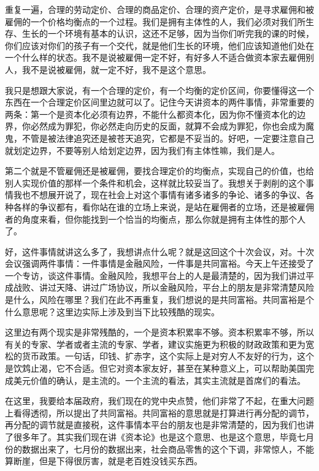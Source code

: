 \documentclass[UTF8, 12pt, a4paper]{ctexrep}
\begin{document}
重复一遍，合理的劳动定价、合理的商品定价、合理的资产定价，是寻求雇佣和被雇佣的一个价格均衡点的一个过程。我们是拥有主体性的人，我们必须对我们所生存、生长的一个环境有基本的认识，这还不足够，因为当你们听完我的课的时候，你们应该对你们的孩子有一个交代，就是他们生长的环境，他们应该知道他们处在一个什么样的状态。我不是说被雇佣一定不好，有好多人不适合做资本家去雇佣别人，我不是说被雇佣，就一定不好，我不是这个意思。

我只是想跟大家说，有一个合理的定价，有一个均衡的定价区间，你要懂得这一个东西在一个合理定价区间里边就可以了。记住今天讲资本的两件事情，非常重要的两条：第一个是资本化必须有边界，不能什么都资本化，因为你不懂资本化的边界，你必然成为罪犯，你必然走向历史的反面，就算不会成为罪犯，你也会成为魔鬼，不管是被法律追究还是被苍天追究，它都是不妥当的。好吧，一定要注意自己就划定边界，不要等别人给划定边界，因为我们有主体性嘛，我们是人。

第二个就是不管雇佣还是被雇佣，要找合理定价的均衡点，实现自己的价值，也给别人实现价值的那样一个条件和机会，这样就比较妥当了。我想关于剥削的这个事情我也不想展开说了，现在社会上对这个事情有诸多诸多的争论、诸多的争议、各种各样的争议都有，看你站在谁的立场上来说，是站在雇佣者的立场，还是被雇佣者的角度来看，但你能找到一个恰当的均衡点，那么你就是拥有主体性的那个人了。

好，这件事情就讲这么多了，我想讲点什么呢？就是这回这个十次会议，对。十次会议强调两件事情：一件事情是金融风险，一件事是共同富裕。今天上午还接受了一个专访，谈这件事情。金融风险，我想平台上的人是最清楚的，因为我们讲过平成战败、讲过天降、讲过广场协议，所以金融风险，平台上的朋友是非常清楚风险是什么，风险在哪里？我们在此不再重复，我们想说的是共同富裕。共同富裕是个什么意思呢？这里边实际上涉及到当下比较残酷的现实。

这里边有两个现实是非常残酷的，一个是资本积累率不够。资本积累率不够，所以有关的专家、学者或者主流的专家、学者，建议实施更为积极的财政政策和更为宽松的货币政策。一句话，印钱、扩赤字，这个实际上是对穷人不友好的行为，这个是饮鸩止渴，它不合适。但它对资本家友好，甚至在某种意义上，可以帮助美国完成美元价值的确认，是主流的。一个主流的看法，其实主流就是首席们的看法。

在这里，我要给本届政府，我们现在的党中央点赞，他们非常了不起，在重大问题上看得透彻，所以提出了共同富裕。共同富裕的意思就是打算进行再分配的调节，再分配的调节就是直接税，这件事情本平台的朋友也是非常清楚的，因为我们也讲了很多年了。其实我们现在讲《资本论》也是这个意思、也是这个意思，毕竟七月份的数据出来了，七月份的数据出来，社会商品零售的这个下调，非常惊人，不能算断崖，但是下得很厉害，就是老百姓没钱买东西。
\end{document}
